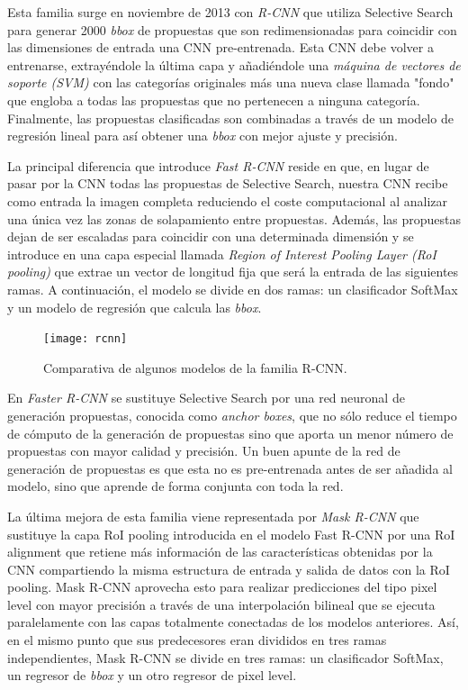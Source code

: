 Esta familia surge en noviembre de 2013 con \emph{R-CNN} \cite{2013arXiv1311.2524G} que utiliza Selective Search \cite{Selective Search for object recognition} para generar 2000 \emph{bbox} de propuestas que son redimensionadas para coincidir con las dimensiones de entrada una CNN pre-entrenada. Esta CNN debe volver a entrenarse, extrayéndole la última capa y añadiéndole una \emph{máquina de vectores de soporte (SVM)} con las categorías originales más una nueva clase llamada "fondo" que engloba a todas las propuestas que no pertenecen a ninguna categoría. Finalmente, las propuestas clasificadas son combinadas a través de un modelo de regresión lineal para así obtener una \emph{bbox} con mejor ajuste y precisión.\newline

La principal diferencia que introduce \emph{Fast R-CNN} \cite{2015arXiv150408083G} reside en que, en lugar de pasar por la CNN todas las propuestas de Selective Search, nuestra CNN recibe como entrada la imagen completa reduciendo el coste computacional al analizar una única vez las zonas de solapamiento entre propuestas. Además, las propuestas dejan de ser escaladas para coincidir con una determinada dimensión y se introduce en una capa especial llamada \emph{Region of Interest Pooling Layer (RoI pooling)} que extrae un vector de longitud fija que será la entrada de las siguientes ramas. A continuación, el modelo se divide en dos ramas: un clasificador SoftMax y un modelo de regresión que calcula las \emph{bbox}. \newline

\begin{figure}[htpb]
  \centering
  \texttt{[image: rcnn]}
  \caption{Comparativa de algunos modelos de la familia R-CNN. \cite{2019arXiv190803673W}}
  \label{fig:r-cnn}
\end{figure}

En \emph{Faster R-CNN} \cite{2015arXiv150601497R} se sustituye Selective Search por una red neuronal de generación propuestas, conocida como \emph{anchor boxes}, que no sólo reduce el tiempo de cómputo de la generación de propuestas sino que aporta un menor número de propuestas con mayor calidad y precisión. Un buen apunte de la red de generación de propuestas es que esta no es pre-entrenada antes de ser añadida al modelo, sino que aprende de forma conjunta con toda la red.\newline

La última mejora de esta familia viene representada por \emph{Mask R-CNN} \cite{2017arXiv170306870H} que sustituye la capa RoI pooling introducida en el modelo Fast R-CNN por una RoI alignment que retiene más información de las características obtenidas por la CNN compartiendo la misma estructura de entrada y salida de datos con la RoI pooling. Mask R-CNN aprovecha esto para realizar predicciones del tipo pixel level con mayor precisión a través de una interpolación bilineal que se ejecuta paralelamente con las capas totalmente conectadas de los modelos anteriores. Así, en el mismo punto que sus predecesores eran divididos en tres ramas independientes, Mask R-CNN se divide en tres ramas: un clasificador SoftMax, un regresor de \emph{bbox} y un otro regresor de pixel level.\newline

